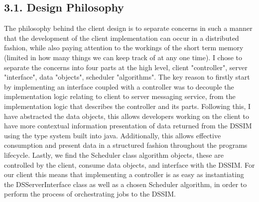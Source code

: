 \documentclass[a4paper]{article} %
\begin{document}
\subsection*{3.1. Design Philosophy}
The philosophy behind the client design is to separate concerns in such a manner that the development of the client implementation can occur in a distributed fashion, while also paying attention to the workings of the short term memory (limited in how many things we can keep track of at any one time). I chose to separate the concerns into four parts at the high level, client "controller", server "interface", data "objects", scheduler "algorithms".
\newline
The key reason to firstly start by implementing an interface coupled with a controller was to decouple the implementation logic relating to client to server messaging service, from the implementation logic that describes the controller and its parts.
\newline
Following this, I have abstracted the data objects, this allows developers working on the client to have more contextual information presentation of data returned from the DSSIM using the type system built into java. Additionally, this allows effective consumption and present data in a structured fashion throughout the programs lifecycle.
\newline
Lastly, we find the Scheduler class algorithm objects, these are controlled by the client, consume data objects, and interface with the DSSIM. For our client this means that implementing a controller is as easy as instantiating the DSServerInterface class as well as a chosen Scheduler algorithm, in order to perform the process of orchestrating jobs to the DSSIM.
\end{document}
